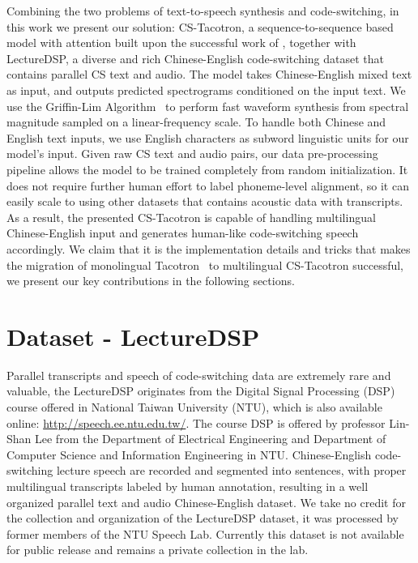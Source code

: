 \documentclass{article} %
\begin{document}
\begin{CJK}{UTF8}{bsmi}
Combining the two problems of text-to-speech synthesis and code-switching, in this work we present our solution: CS-Tacotron, a sequence-to-sequence based model with attention built upon the successful work of \citet{Wang2017}, together with LectureDSP, a diverse and rich Chinese-English code-switching dataset that contains parallel CS text and audio. The model takes Chinese-English mixed text as input, and outputs predicted spectrograms conditioned on the input text. We use the Griffin-Lim Algorithm~\citep{Griffin11984} to perform fast waveform synthesis from spectral magnitude sampled on a linear-frequency scale. To handle both Chinese and English text inputs, we use English characters as subword linguistic units for our model's input. Given raw CS text and audio pairs, our data pre-processing pipeline allows the model to be trained completely from random initialization. It does not require further human effort to label phoneme-level alignment, so it can easily scale to using other datasets that contains acoustic data with transcripts. As a result, the presented CS-Tacotron is capable of handling multilingual Chinese-English input and generates human-like code-switching speech accordingly. We claim that it is the implementation details and tricks that makes the migration of monolingual Tacotron~\citep{Wang2017} to multilingual CS-Tacotron successful, we present our key contributions in the following sections.

\section{Dataset - LectureDSP}
Parallel transcripts and speech of code-switching data are extremely rare and valuable, the LectureDSP originates from the Digital Signal Processing (DSP) course offered in National Taiwan University (NTU), which is also available online: \url{http://speech.ee.ntu.edu.tw/}. The course DSP is offered by professor Lin-Shan Lee from the Department of Electrical Engineering and Department of Computer Science and Information Engineering in NTU. Chinese-English code-switching lecture speech are recorded and segmented into sentences, with proper multilingual transcripts labeled by human annotation, resulting in a well organized parallel text and audio Chinese-English dataset. We take no credit for the collection and organization of the LectureDSP dataset, it was processed by former members of the NTU Speech Lab. Currently this dataset is not available for public release and remains a private collection in the lab.


\end{CJK}
\end{document}
